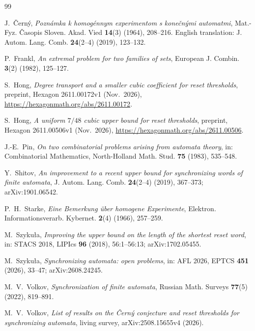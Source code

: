 \documentclass[11pt]{article}
\theoremstyle{definition}
\theoremstyle{remark}
\begin{document}
\begin{thebibliography}{99}

J.~\v{C}ern\'y, \emph{Pozn\'amka k homog\'ennym experimentom s kone\v{c}n\'ymi automatmi}, Mat.-Fyz. \v{C}asopis Sloven. Akad. Vied \textbf{14}(3) (1964), 208--216. English translation: J. Autom. Lang. Comb. \textbf{24}(2--4) (2019), 123--132.

P.~Frankl, \emph{An extremal problem for two families of sets}, European J. Combin. \textbf{3}(2) (1982), 125--127.

S.~Hong, \emph{Degree transport and a smaller cubic coefficient for reset thresholds}, preprint, Hexagon 2611.00172v1 (Nov.\ 2026), \url{https://hexagonmath.org/abs/2611.00172}.

S.~Hong, \emph{A uniform $7/48$ cubic upper bound for reset thresholds}, preprint, Hexagon 2611.00506v1 (Nov.\ 2026), \url{https://hexagonmath.org/abs/2611.00506}.

J.-E.~Pin, \emph{On two combinatorial problems arising from automata theory}, in: Combinatorial Mathematics, North-Holland Math. Stud. \textbf{75} (1983), 535--548.

Y.~Shitov, \emph{An improvement to a recent upper bound for synchronizing words of finite automata}, J. Autom. Lang. Comb. \textbf{24}(2--4) (2019), 367--373; arXiv:1901.06542.

P.~H.~Starke, \emph{Eine Bemerkung \"uber homogene Experimente}, Elektron. Informationsverarb. Kybernet. \textbf{2}(4) (1966), 257--259.

M.~Szyku\l a, \emph{Improving the upper bound on the length of the shortest reset word}, in: STACS 2018, LIPIcs \textbf{96} (2018), 56:1--56:13; arXiv:1702.05455.

M.~Szyku\l a, \emph{Synchronizing automata: open problems}, in: AFL 2026, EPTCS \textbf{451} (2026), 33--47; arXiv:2608.24245.

M.~V.~Volkov, \emph{Synchronization of finite automata}, Russian Math. Surveys \textbf{77}(5) (2022), 819--891.

M.~V.~Volkov, \emph{List of results on the \v{C}ern\'y conjecture and reset thresholds for synchronizing automata}, living survey, arXiv:2508.15655v4 (2026).

\end{thebibliography}
\end{document}
